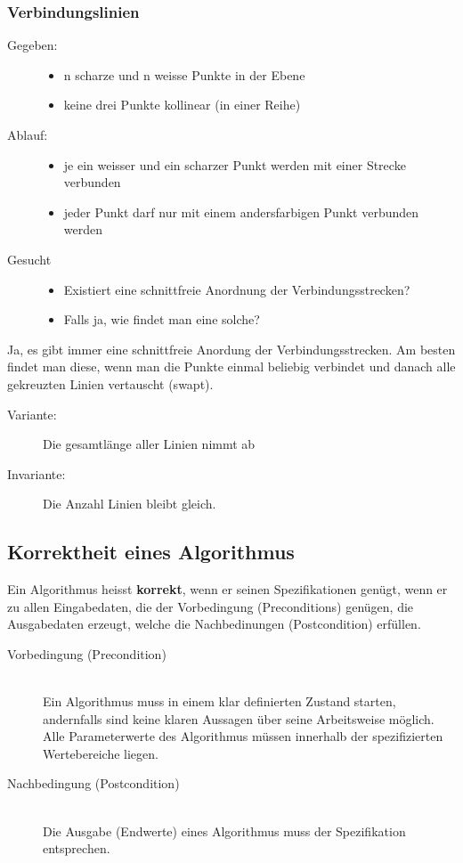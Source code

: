 \documentclass[a4paper,10pt]{article}
\newcommand{\Bold}[1]{\textbf{#1}} %
\begin{document}
\subsubsection{Verbindungslinien}
\begin{description}
	\item[Gegeben:] \hfill
		\begin{itemize}
			\item n scharze und n weisse Punkte in der Ebene
			\item keine drei Punkte kollinear (in einer Reihe)
		\end{itemize}
	\item[Ablauf:] \hfill
		\begin{itemize}
			\item je ein weisser und ein scharzer Punkt werden mit einer Strecke verbunden
			\item jeder Punkt darf nur mit einem andersfarbigen Punkt verbunden werden
		\end{itemize}
	\item[Gesucht] \hfill
		\begin{itemize}
			\item Existiert eine schnittfreie Anordnung der Verbindungsstrecken?
			\item Falls ja, wie findet man eine solche?
		\end{itemize}
\end{description}
Ja, es gibt immer eine schnittfreie Anordung der Verbindungsstrecken. Am besten findet man diese, wenn man die Punkte einmal beliebig verbindet und danach alle gekreuzten Linien vertauscht (swapt).

\begin{description}
	\item[Variante:] Die gesamtl\"ange aller Linien nimmt ab
	\item[Invariante:] Die Anzahl Linien bleibt gleich.
\end{description}

\subsection{Korrektheit eines Algorithmus}
Ein Algorithmus heisst \Bold {korrekt}, wenn er seinen Spezifikationen gen\"ugt, wenn er zu allen Eingabedaten, die der Vorbedingung (Preconditions) gen\"ugen, die Ausgabedaten erzeugt, welche die Nachbedinungen (Postcondition) erf\"ullen. 
\begin{description}
	\item[Vorbedingung (Precondition)] \hfill \\
		Ein Algorithmus muss in einem klar definierten Zustand starten, andernfalls sind keine klaren Aussagen \"uber seine Arbeitsweise m\"oglich. Alle Parameterwerte des Algorithmus m\"ussen innerhalb der spezifizierten Wertebereiche liegen.
	\item[Nachbedingung (Postcondition)] \hfill \\
		Die Ausgabe (Endwerte) eines Algorithmus muss der Spezifikation entsprechen.
\end{description}
\end{document}
